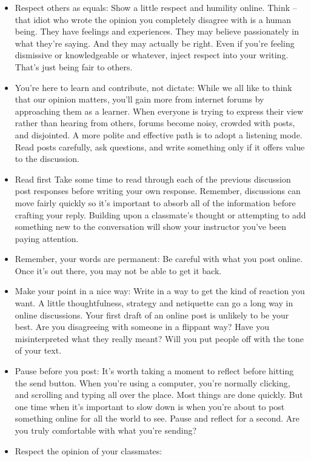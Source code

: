\documentclass{article}
\begin{document}
\begin{itemize}
    \item  Respect others as equals:
    Show a little respect and humility online. Think – that idiot who wrote the opinion you completely disagree with is a human being. They have feelings and experiences. They may believe passionately in what they're saying. And they may actually be right.
    Even if you're feeling dismissive or knowledgeable or whatever, inject respect into your writing. That's just being fair to others.
    \item You're here to learn and contribute, not dictate: 
    While we all like to think that our opinion matters, you'll gain more from internet forums by approaching them as a learner.
    When everyone is trying to express their view rather than hearing from others, forums become noisy, crowded with posts, and disjointed. 
    A more polite and effective path is to adopt a listening mode. Read posts carefully, ask questions, and write something only if it offers value to the discussion.
    \item Read first
    Take some time to read through each of the previous discussion post responses before writing your own response. Remember, discussions can move fairly quickly so it’s important to absorb all of the information before crafting your reply. Building upon a classmate’s thought or attempting to add something new to the conversation will show your instructor you’ve been paying attention.
    \item Remember, your words are permanent: Be careful with what you post online. Once it's out there, you may not be able to get it back.
    \item Make your point in a nice way:
    Write in a way to get the kind of reaction you want. A little thoughtfulness, strategy and netiquette can go a long way in online discussions.
    Your first draft of an online post is unlikely to be your best. Are you disagreeing with someone in a flippant way? Have you misinterpreted what they really meant? Will you put people off with the tone of your text.
    \item Pause before you post:
    It's worth taking a moment to reflect before hitting the send button.
    When you're using a computer, you're normally clicking, and scrolling and typing all over the place. Most things are done quickly. But one time when it's important to slow down is when you're about to post something online for all the world to see. Pause and reflect for a second. Are you truly comfortable with what you're sending?
    \item Respect the opinion of your classmates: 

\end{itemize}
\end{document}
